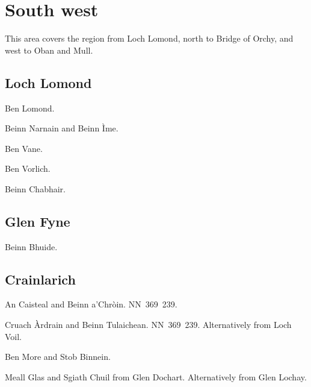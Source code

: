 \section{South west}

This area covers the region from Loch Lomond, north to Bridge of Orchy, and
west to Oban and Mull.  

\subsection{Loch Lomond}

\begin{munros}
\item Ben Lomond.

\item Beinn Narnain and Beinn Ìme.

\item Ben Vane.

\item Ben Vorlich.

\item Beinn Chabhair.
\end{munros}


\subsection{Glen Fyne}

\begin{munros}
\item Beinn Bhuide.
\end{munros}


\subsection{Crainlarich}

\begin{munros}
\item An Caisteal and Beinn a'Chròin.  NN~369~239.

\item \target Cruach Àrdrain and Beinn Tulaichean.  NN~369~239.  Alternatively
  from Loch Voil.

\item Ben More and Stob Binnein.

\item Meall Glas and Sgiath Chuil from Glen Dochart.  Alternatively from Glen
  Lochay. 
\end{munros}

